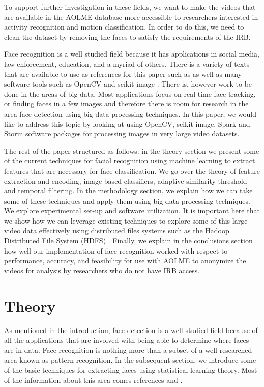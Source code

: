 \documentclass[
	submission,
	final,
	notitlepage,
	narroweqnarray,
	inline,
	twoside,
	]{ieee}
\begin{document}
To support further investigation in these fields, we want to make the videos that are available
in the AOLME database more accessible to researchers interested in 
activity recognition and motion classification. In order to do this, 
we need to clean the dataset by removing the faces to satisfy the requirements
of the IRB.

Face recognition is a well studied field because it has applications in 
social media, law enforcement, education, and a myriad of others. There is a 
variety of texts that are available to use as references for this paper such
as \cite{face_recog_book} \cite{kernel_learning} \cite{machine_face_recog} 
as well as many software tools such as OpenCV \cite{opencv} and scikit-image
\cite{scikit-image}. There is, however work to be done in the areas of
big data. Most applications focus on real-time face tracking, or finding
faces in a few images and therefore there is room for research in the area
face detection using big data processing techniques. In this paper, we
would like to address this topic by looking at using OpenCV, scikit-image, 
Spark and Storm software packages for processing images in very large
video datasets.

The rest of the paper structured as follows: in the theory section we 
present some of the current techniques for facial recognition using 
machine learning to extract features that are necessary for face 
classification. We go over the theory of feature extraction and encoding, 
image-based classifiers, adaptive similarity threshold and temporal filtering. 
In the methodology section, we explain how we can take some of these
techniques and apply them using big data processing techniques. 
We explore experimental set-up and software utilization. It is 
important here that we show how we can leverage existing techniques
to explore some of this large video data effectively using distributed
files systems such as the Hadoop Distributed File System (HDFS) \cite{hadoop}. 
Finally, we explain in the conclusions section how well our 
implementation of face recognition worked with respect to 
performance, accuracy, and feasibility for use with AOLME to
 anonymize the videos for analysis by researchers who do not have
IRB access.  

\section{Theory}
\PARstart As mentioned in the introduction, face detection is a well 
studied field because of all the applications that are involved with 
being able to determine where faces are in data. Face recognition
is nothing more than a subset of a well researched area known as 
pattern recognition. In the subsequent section, we introduce some
of the basic techniques for extracting faces using statistical 
learning theory. Most of the information about this area comes
references \cite{face_recog_book} and \cite{kernel_learning}.
\end{document}
